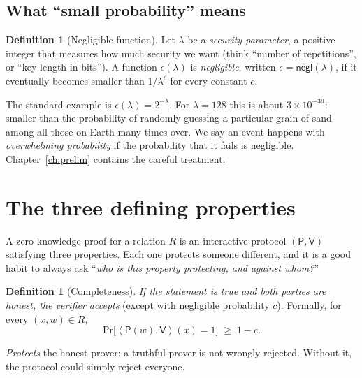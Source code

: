 \documentclass[11pt,a4paper]{report}
\theoremstyle{plain}
\theoremstyle{definition}
\newtheorem{definition}[theorem]{Definition}
\theoremstyle{remark}
\newcommand{\negl}{\mathsf{negl}}
\renewcommand{\Pr}{\mathrm{Pr}}
\newcommand{\Prv}{\mathsf{P}}\newcommand{\Ver}{\mathsf{V}}
\newcommand{\pair}[2]{\left\langle #1,#2\right\rangle}
\begin{document}
\subsection{What ``small probability'' means}
\begin{definition}[Negligible function]\label{def:intro-negl}
Let $\lambda$ be a \emph{security parameter}, a positive integer that measures how much security we want (think ``number of repetitions'', or ``key length in bits''). A function $\epsilon(\lambda)$ is \emph{negligible}, written $\epsilon=\negl(\lambda)$, if it eventually becomes smaller than $1/\lambda^c$ for every constant $c$.
\end{definition}
The standard example is $\epsilon(\lambda)=2^{-\lambda}$. For $\lambda=128$ this is about $3\times 10^{-39}$: smaller than the probability of randomly guessing a particular grain of sand among all those on Earth many times over. We say an event happens with \emph{overwhelming probability} if the probability that it fails is negligible. Chapter~\ref{ch:prelim} contains the careful treatment.

\section{The three defining properties}\label{sec:threeprops}
A zero-knowledge proof for a relation $R$ is an interactive protocol $(\Prv,\Ver)$ satisfying three properties.
Each one protects someone different, and it is a good habit to always ask ``\emph{who is this property protecting, and against whom?}''

\begin{definition}[Completeness]\label{def:intro-complete}
\emph{If the statement is true and both parties are honest, the verifier accepts} (except with negligible probability $c$). Formally, for every $(x,w)\in R$,
\[
 \Pr\big[\pair{\Prv(w)}{\Ver}(x)=1\big]\;\ge\;1-c.
\]
\end{definition}
\emph{Protects} the honest prover: a truthful prover is not wrongly rejected. Without it, the protocol could simply reject everyone.
\end{document}
